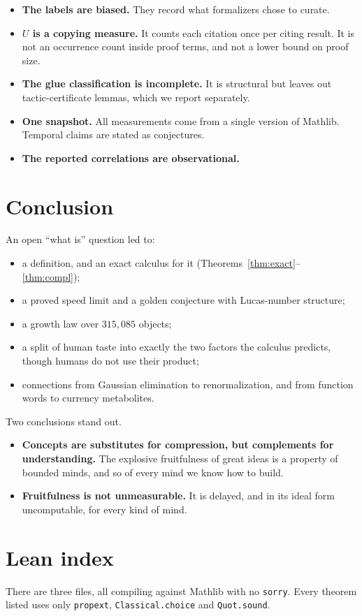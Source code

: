 \documentclass[11pt]{article}
\theoremstyle{remark}
\newcommand{\lean}[1]{\texttt{#1}}
\begin{document}
\begin{itemize}
\item \textbf{The labels are biased.} They record what formalizers chose to curate.
\item \textbf{$U$ is a copying measure.} It counts each citation once per citing result.
  It is not an occurrence count inside proof terms, and not a lower bound on proof size.
\item \textbf{The glue classification is incomplete.} It is structural but leaves out
  tactic-certificate lemmas, which we report separately.
\item \textbf{One snapshot.} All measurements come from a single version of Mathlib.
  Temporal claims are stated as conjectures.
\item \textbf{The reported correlations are observational.}
\end{itemize}

\section{Conclusion}

An open ``what is'' question led to:
\begin{itemize}
\item a definition, and an exact calculus for it (Theorems~\ref{thm:exact}--\ref{thm:compl});
\item a proved speed limit and a golden conjecture with Lucas-number structure;
\item a growth law over $315{,}085$ objects;
\item a split of human taste into exactly the two factors the calculus predicts, though
  humans do not use their product;
\item connections from Gaussian elimination to renormalization, and from function words
  to currency metabolites.
\end{itemize}
Two conclusions stand out.
\begin{itemize}
\item \textbf{Concepts are substitutes for compression, but complements for understanding.}
  The explosive fruitfulness of great ideas is a property of bounded minds, and so of
  every mind we know how to build.
\item \textbf{Fruitfulness is not unmeasurable.} It is delayed, and in its ideal form
  uncomputable, for every kind of mind.
\end{itemize}

\appendix
\section{Lean index}\label{app:lean}
There are three files, all compiling against Mathlib with no \lean{sorry}. Every theorem
listed uses only \lean{propext}, \lean{Classical.choice} and \lean{Quot.sound}.
\end{document}
